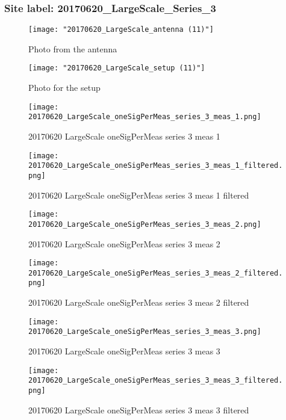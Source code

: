 \subsubsection{Site label: 20170620\_LargeScale\_Series\_3}
\begin{figure}[ht] \caption{Photo from the antenna}
\texttt{[image: "20170620\_LargeScale\_antenna (11)"]}\centering\end{figure}
\begin{figure}[ht] \caption{Photo for the setup}
\texttt{[image: "20170620\_LargeScale\_setup (11)"]}\centering\end{figure}
\begin{figure}[ht] \caption{20170620 LargeScale oneSigPerMeas series 3 meas 1}
\texttt{[image: 20170620\_LargeScale\_oneSigPerMeas\_series\_3\_meas\_1.png]}\centering\end{figure}
\begin{figure}[ht] \caption{20170620 LargeScale oneSigPerMeas series 3 meas 1 filtered}
\texttt{[image: 20170620\_LargeScale\_oneSigPerMeas\_series\_3\_meas\_1\_filtered.png]}\centering\end{figure}
\begin{figure}[ht] \caption{20170620 LargeScale oneSigPerMeas series 3 meas 2}
\texttt{[image: 20170620\_LargeScale\_oneSigPerMeas\_series\_3\_meas\_2.png]}\centering\end{figure}
\begin{figure}[ht] \caption{20170620 LargeScale oneSigPerMeas series 3 meas 2 filtered}
\texttt{[image: 20170620\_LargeScale\_oneSigPerMeas\_series\_3\_meas\_2\_filtered.png]}\centering\end{figure}
\begin{figure}[ht] \caption{20170620 LargeScale oneSigPerMeas series 3 meas 3}
\texttt{[image: 20170620\_LargeScale\_oneSigPerMeas\_series\_3\_meas\_3.png]}\centering\end{figure}
\begin{figure}[ht] \caption{20170620 LargeScale oneSigPerMeas series 3 meas 3 filtered}
\texttt{[image: 20170620\_LargeScale\_oneSigPerMeas\_series\_3\_meas\_3\_filtered.png]}\centering\end{figure}
\clearpage
